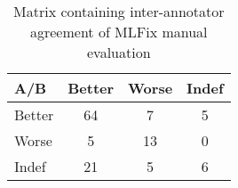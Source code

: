 \begin{table*}[t]
\centering
\small

\begin{tabular}{l|cc|c}
 A/B  &  Better  &  Worse  &  Indef  \\
\hline
Better  &  64  &  7  &  5  \\
Worse  &  5  &  13  &  0  \\
\hline
Indef &  21  &  5  &  6  \\
\end{tabular}
\caption{
	Matrix containing inter-annotator agreement of MLFix manual evaluation
}
\label{maneval-agree}
\end{table*}

